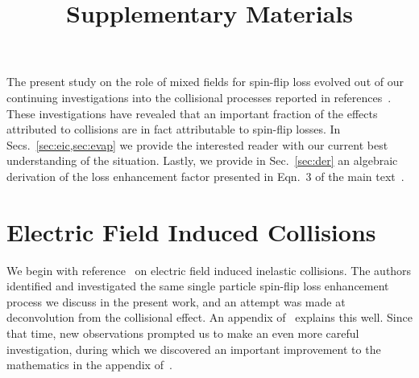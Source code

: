 \documentclass[%
 reprint,
 amsmath,amssymb,
 aps,
pra,
]{revtex4-1}
\begin{document}

\title{Supplementary Materials}%
\maketitle

The present study on the role of mixed fields for spin-flip loss evolved out of our continuing investigations into the collisional processes reported in references~\cite{Stuhl2013,Stuhl2012evap}.
These investigations have revealed that an important fraction of the effects attributed to collisions are in fact attributable to spin-flip losses.
In Secs.~\ref{sec:eic,sec:evap} we provide the interested reader with our current best understanding of the situation.
Lastly, we provide in Sec.~\ref{sec:der} an algebraic derivation of the loss enhancement factor presented in Eqn.~3 of the main text~\cite{smt}.

\section{Electric Field Induced Collisions}
We begin with reference~\cite{Stuhl2013} on electric field induced inelastic collisions. 
The authors identified and investigated the same single particle spin-flip loss enhancement process we discuss in the present work, and an attempt was made at deconvolution from the collisional effect. 
An appendix of~\cite{Stuhl2013} explains this well.
Since that time, new observations prompted us to make an even more careful investigation, during which we discovered an important improvement to the mathematics in the appendix of~\cite{Stuhl2013}.
\end{document}
